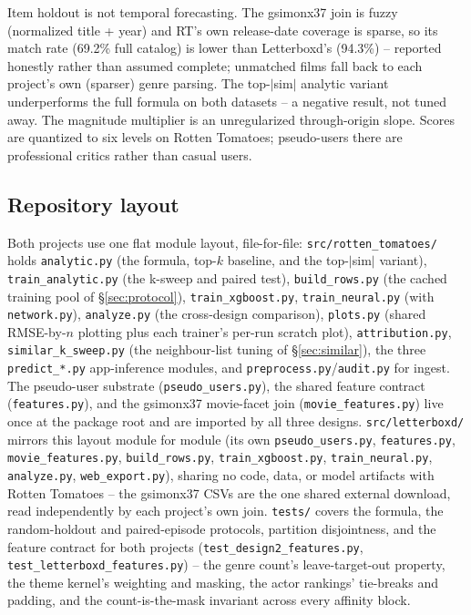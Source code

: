 \documentclass[11pt]{article}
\begin{document}
Item holdout is not temporal forecasting. The gsimonx37 join is fuzzy (normalized title + year) and RT's own release-date coverage is sparse, so its match rate (69.2\% full catalog) is lower than Letterboxd's (94.3\%) -- reported honestly rather than assumed complete; unmatched films fall back to each project's own (sparser) genre parsing. The top-$|$sim$|$ analytic variant underperforms the full formula on both datasets -- a negative result, not tuned away. The magnitude multiplier is an unregularized through-origin slope. Scores are quantized to six levels on Rotten Tomatoes; pseudo-users there are professional critics rather than casual users.

\subsection*{Repository layout}

Both projects use one flat module layout, file-for-file: \texttt{src/rotten\_tomatoes/} holds \texttt{analytic.py} (the formula, top-$k$ baseline, and the top-$|$sim$|$ variant), \texttt{train\_analytic.py} (the k-sweep and paired test), \texttt{build\_rows.py} (the cached training pool of \S\ref{sec:protocol}), \texttt{train\_xgboost.py}, \texttt{train\_neural.py} (with \texttt{network.py}), \texttt{analyze.py} (the cross-design comparison), \texttt{plots.py} (shared RMSE-by-$n$ plotting plus each trainer's per-run scratch plot), \texttt{attribution.py}, \texttt{similar\_k\_sweep.py} (the neighbour-list tuning of \S\ref{sec:similar}), the three \texttt{predict\_*.py} app-inference modules, and \texttt{preprocess.py}/\texttt{audit.py} for ingest. The pseudo-user substrate (\texttt{pseudo\_users.py}), the shared feature contract (\texttt{features.py}), and the gsimonx37 movie-facet join (\texttt{movie\_features.py}) live once at the package root and are imported by all three designs. \texttt{src/letterboxd/} mirrors this layout module for module (its own \texttt{pseudo\_users.py}, \texttt{features.py}, \texttt{movie\_features.py}, \texttt{build\_rows.py}, \texttt{train\_xgboost.py}, \texttt{train\_neural.py}, \texttt{analyze.py}, \texttt{web\_export.py}), sharing no code, data, or model artifacts with Rotten Tomatoes -- the gsimonx37 CSVs are the one shared external download, read independently by each project's own join. \texttt{tests/} covers the formula, the random-holdout and paired-episode protocols, partition disjointness, and the feature contract for both projects (\texttt{test\_design2\_features.py}, \texttt{test\_letterboxd\_features.py}) -- the genre count's leave-target-out property, the theme kernel's weighting and masking, the actor rankings' tie-breaks and padding, and the count-is-the-mask invariant across every affinity block.
\end{document}
